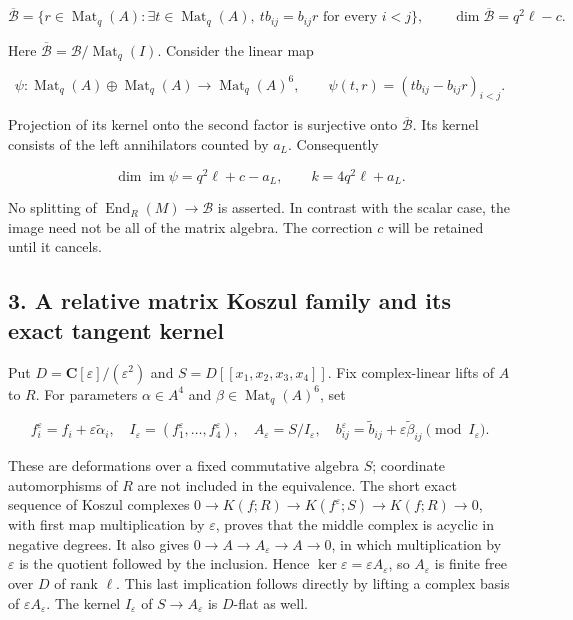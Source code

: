 \[
 \overline{\mathcal B}
   =\{r\in\operatorname{Mat}_q(A):
         \exists t\in\operatorname{Mat}_q(A),\ t b_{ij}=b_{ij}r
          \text{ for every }i<j\},
 \qquad
 \dim\overline{\mathcal B}=q^2\ell-c.
 \tag{MC.8}
\]

Here \(\overline{\mathcal B}=\mathcal B/\operatorname{Mat}_q(I)\).
Consider the linear map

\[
 \psi:\operatorname{Mat}_q(A)\oplus\operatorname{Mat}_q(A)
      \longrightarrow\operatorname{Mat}_q(A)^6,
 \qquad \psi(t,r)=(t b_{ij}-b_{ij}r)_{i<j}.
 \tag{MC.9}
\]

Projection of its kernel onto the second factor is surjective onto
\(\overline{\mathcal B}\). Its kernel consists of the left annihilators
counted by \(a_L\). Consequently

\[
 \dim\operatorname{im}\psi=q^2\ell+c-a_L,
 \qquad k=4q^2\ell+a_L.
 \tag{MC.10}
\]

No splitting of \(\operatorname{End}_R(M)\to\mathcal B\) is asserted.
In contrast with the scalar case, the image need not be all of the
matrix algebra. The correction \(c\) will be retained until it cancels.

\subsection{3. A relative matrix Koszul family and its exact tangent kernel}\label{SF-E848:s3}

Put \(D=\mathbf C[\varepsilon]/(\varepsilon^2)\) and
\(S=D[[x_1,x_2,x_3,x_4]]\). Fix complex-linear lifts of \(A\) to
\(R\). For parameters \(\alpha\in A^4\) and
\(\beta\in\operatorname{Mat}_q(A)^6\), set

\[
 f_i^\varepsilon=f_i+\varepsilon\widetilde\alpha_i,
 \quad I_\varepsilon=(f_1^\varepsilon,\ldots,f_4^\varepsilon),
 \quad A_\varepsilon=S/I_\varepsilon,
 \quad b_{ij}^\varepsilon=\widetilde b_{ij}
                   +\varepsilon\widetilde\beta_{ij}\pmod{I_\varepsilon}.
 \tag{MC.11}
\]

These are deformations over a fixed commutative algebra \(S\);
coordinate automorphisms of \(R\) are not included in the equivalence.
The short exact sequence of Koszul complexes
\(0\to K(f;R)\to K(f^\varepsilon;S)\to K(f;R)\to0\), with first
map multiplication by \(\varepsilon\), proves that the middle complex
is acyclic in negative degrees. It also gives
\(0\to A\to A_\varepsilon\to A\to0\), in which multiplication by
\(\varepsilon\) is the quotient followed by the inclusion. Hence
\(\ker\varepsilon=\varepsilon A_\varepsilon\), so
\(A_\varepsilon\) is finite free over \(D\) of rank \(\ell\).
This last implication follows directly by lifting a complex basis of
\(\varepsilon A_\varepsilon\). The kernel \(I_\varepsilon\) of
\(S\to A_\varepsilon\) is \(D\)-flat as well.

